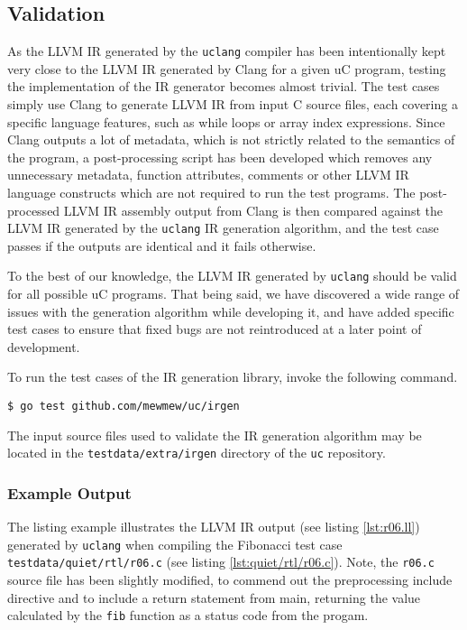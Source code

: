 \subsection{Validation}
\label{sec:irgen_validation}

As the LLVM IR generated by the \texttt{uclang} compiler has been intentionally kept very close to the LLVM IR generated by Clang for a given uC program, testing the implementation of the IR generator becomes almost trivial. The test cases simply use Clang to generate LLVM IR from input C source files, each covering a specific language features, such as while loops or array index expressions. Since Clang outputs a lot of metadata, which is not strictly related to the semantics of the program, a post-processing script has been developed which removes any unnecessary metadata, function attributes, comments or other LLVM IR language constructs which are not required to run the test programs. The post-processed LLVM IR assembly output from Clang is then compared against the LLVM IR generated by the \texttt{uclang} IR generation algorithm, and the test case passes if the outputs are identical and it fails otherwise.

To the best of our knowledge, the LLVM IR generated by \texttt{uclang} should be valid for all possible uC programs. That being said, we have discovered a wide range of issues with the generation algorithm while developing it, and have added specific test cases to ensure that fixed bugs are not reintroduced at a later point of development.

To run the test cases of the IR generation library, invoke the following command.

\begin{verbatim}
$ go test github.com/mewmew/uc/irgen
\end{verbatim}

The input source files used to validate the IR generation algorithm may be located in the \texttt{testdata/extra/irgen} directory of the \texttt{uc} repository.

\subsubsection{Example Output}

The listing example illustrates the LLVM IR output (see listing \ref{lst:r06.ll}) generated by \texttt{uclang} when compiling the Fibonacci test case \texttt{testdata/quiet/rtl/r06.c} (see listing \ref{lst:quiet/rtl/r06.c}). Note, the \texttt{r06.c} source file has been slightly modified, to commend out the preprocessing include directive and to include a return statement from main, returning the value calculated by the \texttt{fib} function as a status code from the progam.

